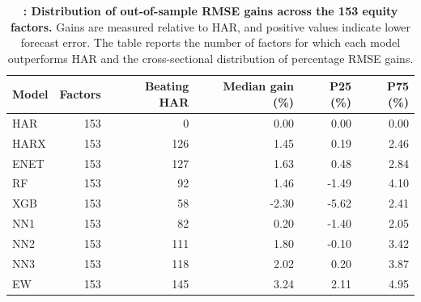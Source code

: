 \begin{table}[htbp]
\centering\footnotesize
\captionsetup{justification=raggedright,labelsep=none,singlelinecheck=false,labelformat=boldlabel}
\renewcommand{\arraystretch}{1.15}
\setlength{\tabcolsep}{4pt}
\caption[Distribution of out-of-sample RMSE gains across the 153 equity factors.]{\footnotesize \textbf{: Distribution of out-of-sample RMSE gains across the 153 equity factors.} Gains are measured relative to HAR, and positive values indicate lower forecast error. The table reports the number of factors for which each model outperforms HAR and the cross-sectional distribution of percentage RMSE gains.}\label{tab:rv-factor_gain_summary}
\begin{tabular}{lrrrrr}
\hline
Model & Factors & Beating HAR & Median gain (\%) & P25 (\%) & P75 (\%) \\
\hline
HAR & 153 & 0 & 0.00 & 0.00 & 0.00 \\
HARX & 153 & 126 & 1.45 & 0.19 & 2.46 \\
ENET & 153 & 127 & 1.63 & 0.48 & 2.84 \\
RF & 153 & 92 & 1.46 & -1.49 & 4.10 \\
XGB & 153 & 58 & -2.30 & -5.62 & 2.41 \\
NN1 & 153 & 82 & 0.20 & -1.40 & 2.05 \\
NN2 & 153 & 111 & 1.80 & -0.10 & 3.42 \\
NN3 & 153 & 118 & 2.02 & 0.20 & 3.87 \\
EW & 153 & 145 & 3.24 & 2.11 & 4.95 \\
\hline
\end{tabular}
\end{table}
